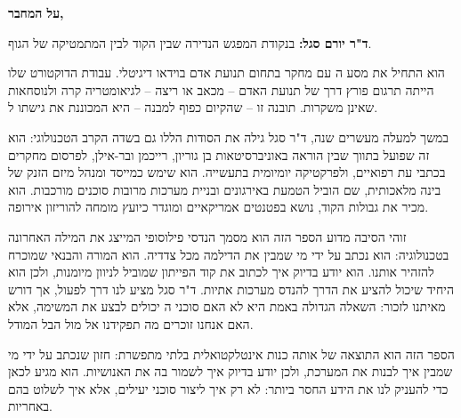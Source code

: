 \documentclass{hebrew-academic-template}
\begin{document}
\textbf{על המחבר,}

\textbf{ד"ר יורם סגל:} בנקודת המפגש הנדירה שבין הקוד לבין המתמטיקה של הגוף.

הוא התחיל את מסע ה עם מחקר בתחום תנועת אדם בוידאו דיגיטלי. עבודת הדוקטורט שלו הייתה תרגום פורץ דרך של תנועת האדם – מכאב או ריצה – לגיאומטריה קרה ולנוסחאות שאינן משקרות. תובנה זו – שהקיום כפוף למבנה – היא המכוננת את גישתו ל.

במשך למעלה מעשרים שנה, ד"ר סגל גילה את הסודות הללו גם בשדה הקרב הטכנולוגי: הוא זה שפועל בתווך שבין הוראה באוניברסיטאות בן גוריון, רייכמן ובר-אילן, לפרסום מחקרים בכתבי עת רפואיים, ולפרקטיקה יומיומית בתעשייה. הוא שימש כמייסד ומנהל מיזם הזנק של בינה מלאכותית, שם הוביל הטמעת  באירגונים ובניית מערכות מרובות סוכנים מורכבות. הוא מכיר את גבולות הקוד, נושא בפטנטים אמריקאיים ומוגדר כיועץ מומחה להוריזון אירופה.

זוהי הסיבה מדוע הספר הזה הוא מסמך הנדסי פילוסופי המייצג את המילה האחרונה בטכנולוגיה: הוא נכתב על ידי מי שמבין את הדילמה מכל צדדיה. הוא המורה והבנאי שמוכרח להזהיר אותנו. הוא יודע בדיוק איך לכתוב את קוד הפייתון שמוביל לניוון מיומנות, ולכן הוא היחיד שיכול להציע את הדרך להנדס מערכות אתיות. ד"ר סגל מציע לנו דרך לפעול, אך דורש מאיתנו לזכור: השאלה הגדולה באמת היא לא האם סוכני ה יכולים לבצע את המשימה, אלא האם אנחנו זוכרים מה תפקידנו אל מול הבל המודל.

הספר הזה הוא התוצאה של אותה כנות אינטלקטואלית בלתי מתפשרת: חזון שנכתב על ידי מי שמבין איך לבנות את המערכת, ולכן יודע בדיוק איך לשמור בה את האנושיות. הוא מגיע לכאן כדי להעניק לנו את הידע החסר ביותר: לא רק איך ליצור סוכני  יעילים, אלא איך לשלוט בהם באחריות.

\fancyfoot[LE]{\en{\thepage}}
\fancyfoot[RO]{\en{\thepage}}
\end{document}
